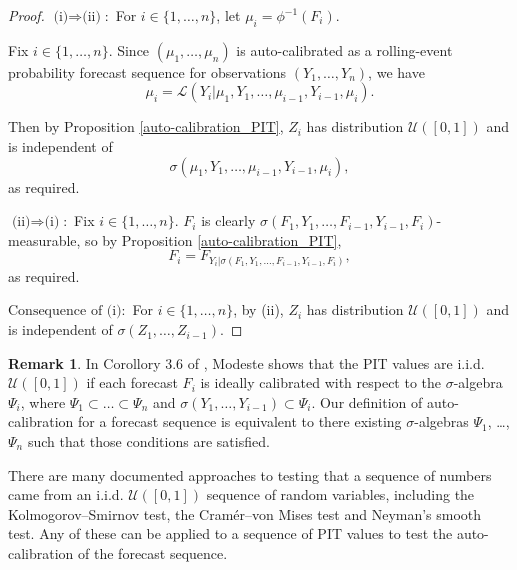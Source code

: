 \documentclass[aap]{imsart}
\theoremstyle{plain}
\theoremstyle{definition}
\newtheorem*{remark}{Remark}
\begin{document}
\begin{proof}
  $\text{(i)} \Rightarrow \text{(ii)}$:\, For $i \in \{1, \ldots, n\}$, let $\mu_i = \phi^{-1}(F_i)$.

  Fix $i \in \{1, \ldots, n\}$. Since $(\mu_1, \ldots, \mu_n)$ is auto-calibrated as a rolling-event probability forecast sequence for observations $(Y_1, \ldots, Y_n)$, we have
\begin{equation*}
  \mu_i = \mathcal{L}(Y_i|\mu_1, Y_1, \ldots, \mu_{i-1}, Y_{i-1}, \mu_i).
\end{equation*}

  Then by Proposition \ref{auto-calibration_PIT}, $Z_i$ has distribution $\mathcal{U}([0,1])$ and is independent of
\begin{equation*}
  \sigma(\mu_1, Y_1, \ldots, \mu_{i-1}, Y_{i-1}, \mu_i),
\end{equation*}
  as required.

  $\text{(ii)} \Rightarrow \text{(i)}$:\, Fix $i \in \{1, \ldots, n\}$. $F_i$ is clearly $\sigma(F_1, Y_1, \ldots, F_{i-1}, Y_{i-1}, F_i)$-measurable, so by Proposition \ref{auto-calibration_PIT},
\begin{equation*}
  F_i = F_{Y_i|\sigma(F_1, Y_1, \ldots, F_{i-1}, Y_{i-1}, F_i)},
\end{equation*}
as required.

  $\text{Consequence of (i)}$:\, For $i \in \{1, \ldots, n\}$, by (ii), $Z_i$ has distribution $\mathcal{U}([0,1])$ and is independent of $\sigma(Z_1, \ldots, Z_{i-1})$.
\end{proof}

\begin{remark}
In Corollory 3.6 of \cite{Mds23}, Modeste shows that the PIT values are i.i.d. $\mathcal{U}([0,1])$ if each forecast $F_i$ is ideally calibrated with respect to the $\sigma$-algebra $\Psi_i$, where $\Psi_1 \subset \ldots \subset \Psi_n$ and $\sigma(Y_1, \ldots, Y_{i-1}) \subset \Psi_i$. Our definition of auto-calibration for a forecast sequence is equivalent to there existing $\sigma$-algebras $\Psi_1$, \ldots, $\Psi_n$ such that those conditions are satisfied.
\end{remark}

There are many documented approaches to testing that a sequence of numbers came from an i.i.d. $\mathcal{U}([0,1])$ sequence of random variables, including the Kolmogorov--Smirnov test, the Cram\'er--von Mises test and Neyman's smooth test. Any of these can be applied to a sequence of PIT values to test the auto-calibration of the forecast sequence.
\end{document}
